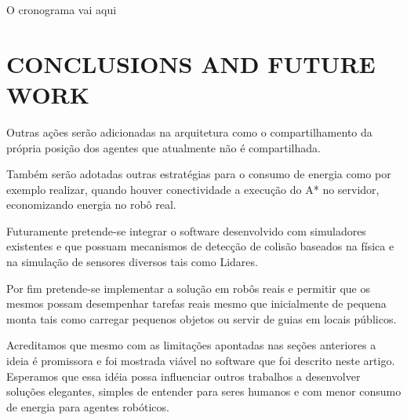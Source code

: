 \documentclass[eq,capa]{texufpel}
\begin{document}
O cronograma vai aqui


\chapter{CONCLUSIONS AND FUTURE WORK}

Outras ações serão adicionadas na arquitetura como o compartilhamento da própria posição dos agentes que atualmente não é compartilhada.

Também serão adotadas outras estratégias para o consumo de energia como por exemplo realizar, quando houver conectividade a execução do A* no servidor, economizando energia no robô real.

Futuramente pretende-se integrar o software desenvolvido com simuladores existentes e que possuam mecanismos de detecção de colisão baseados na física e na simulação de sensores diversos tais como Lidares.




Por fim pretende-se implementar a solução em robôs reais e permitir que os mesmos possam desempenhar tarefas reais mesmo que inicialmente de pequena monta tais como carregar pequenos objetos ou servir de guias em locais públicos.

Acreditamos que mesmo com as limitações apontadas nas seções anteriores a ideia é promissora e foi mostrada viável no software que foi descrito neste artigo. Esperamos que essa idéia possa influenciar outros trabalhos a desenvolver soluções elegantes, simples de entender para seres humanos e com menor consumo de energia para agentes robóticos.


\end{document}
